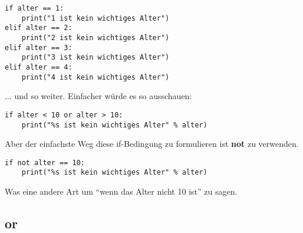\begin{Verbatim}[frame=single]
if alter == 1:
    print("1 ist kein wichtiges Alter")
elif alter == 2:
    print("2 ist kein wichtiges Alter")
elif alter == 3:
    print("3 ist kein wichtiges Alter")
elif alter == 4:
    print("4 ist kein wichtiges Alter")
\end{Verbatim}

\noindent
$\ldots$ und so weiter. Einfacher würde es so ausschauen:
\begin{Verbatim}[frame=single]
if alter < 10 or alter > 10:
    print("%s ist kein wichtiges Alter" % alter)
\end{Verbatim}

\noindent
Aber der einfachste Weg diese if-Bedingung zu formulieren ist \textbf{not} zu verwenden.

\begin{Verbatim}[frame=single]
if not alter == 10:
    print("%s ist kein wichtiges Alter" % alter)
\end{Verbatim}

\noindent
Was eine andere Art um ``wenn das Alter nicht 10 ist'' zu sagen.

\subsection*{or}

